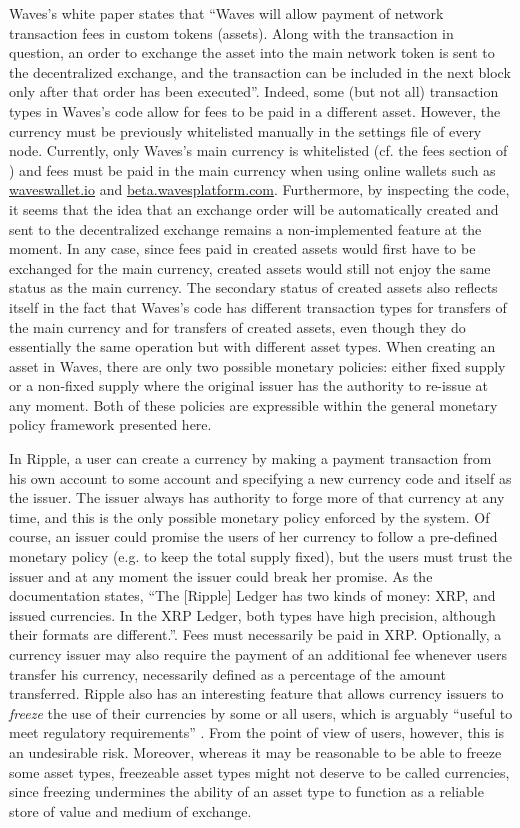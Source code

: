 \documentclass{llncs}
\begin{document}
Waves's white paper \cite{Waves} states that ``Waves will allow payment of network transaction fees in custom tokens (assets). Along with the transaction in question, an order to exchange the asset into the main network token is sent to the decentralized exchange, and the transaction can be included in the next block only after that order has been executed''. Indeed, some (but not all) transaction types in Waves's code allow for fees to be paid in a different asset. However, the currency must be previously whitelisted manually in the settings file of every node. Currently, only Waves's main currency is whitelisted (cf. the fees section of \cite{WavesCodeApplicationConf}) and fees must be paid in the main currency when using online wallets such as \url{waveswallet.io} and \url{beta.wavesplatform.com}. Furthermore, by inspecting the code, it seems that the idea that an exchange order will be automatically created and sent to the decentralized exchange remains a non-implemented feature at the moment. In any case, since fees paid in created assets would first have to be exchanged for the main currency, created assets would still not enjoy the same status as the main currency. The secondary status of created assets also reflects itself in the fact that Waves's code has different transaction types for transfers of the main currency and for transfers of created assets, even though they do essentially the same operation but with different asset types. When creating an asset in Waves, there are only two possible monetary policies: either fixed supply or a non-fixed supply where the original issuer has the authority to re-issue at any moment. Both of these policies are expressible within the general monetary policy framework presented here.

In Ripple, a user can create a currency by making a payment transaction from his own account to some account and specifying a new currency code and itself as the issuer. The issuer always has authority to forge more of that currency at any time, and this is the only possible monetary policy enforced by the system. Of course, an issuer could promise the users of her currency to follow a pre-defined monetary policy (e.g. to keep the total supply fixed), but the users must trust the issuer and at any moment the issuer could break her promise. As the documentation \cite{RippleCurrencyFormat} states, ``The [Ripple] Ledger has two kinds of money: XRP, and issued currencies. In the XRP Ledger, both types have high precision, although their formats are different.''. Fees must necessarily be paid in XRP. Optionally, a currency issuer may also require the payment of an additional fee whenever users transfer his currency, necessarily defined as a percentage of the amount transferred. Ripple also has an interesting feature that allows currency issuers to \emph{freeze} the use of their currencies by some or all users, which is arguably ``useful to meet regulatory requirements'' \cite{RippleFreeze}. From the point of view of users, however, this is an undesirable risk. Moreover, whereas it may be reasonable to be able to freeze some asset types, freezeable asset types might not deserve to be called currencies, since freezing undermines the ability of an asset type to function as a reliable store of value and medium of exchange.
\end{document}
